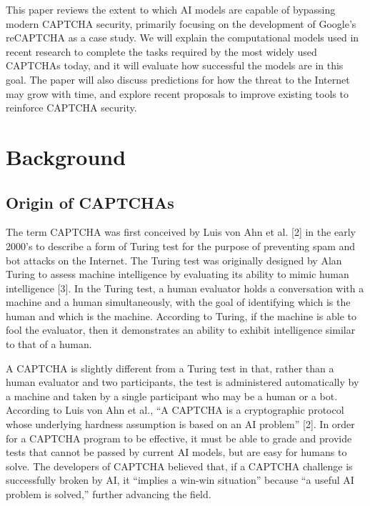 \documentclass[sigplan,screen,nonacm]{acmart-tagged}
\begin{document}
This paper reviews the extent to which AI models are capable of bypassing modern CAPTCHA security, primarily focusing on the development of Google's reCAPTCHA as a case study. We will explain the computational models used in recent research to complete the tasks required by the most widely used CAPTCHAs today, and it will evaluate how successful the models are in this goal. The paper will also discuss predictions for how the threat to the Internet may grow with time, and explore recent proposals to improve existing tools to reinforce CAPTCHA security.
 

\section{Background}
\label{background}

\subsection{Origin of CAPTCHAs}
\label{sec:background-captcha}

The term CAPTCHA was first conceived by Luis von Ahn et al. [2] in the early 2000's to describe a form of Turing test for the purpose of preventing spam and bot attacks on the Internet. The Turing test was originally designed by Alan Turing to assess machine intelligence by evaluating its ability to mimic human intelligence [3]. In the Turing test, a human evaluator holds a conversation with a machine and a human simultaneously, with the goal of identifying which is the human and which is the machine. According to Turing, if the machine is able to fool the evaluator, then it demonstrates an ability to exhibit intelligence similar to that of a human.

A CAPTCHA is slightly different from a Turing test in that, rather than a human evaluator and two participants, the test is administered automatically by a machine and taken by a single participant who may be a human or a bot. According to Luis von Ahn et al., ``A CAPTCHA is a cryptographic protocol whose underlying hardness assumption is based on an AI problem'' [2]. In order for a CAPTCHA program to be effective, it must be able to grade and provide tests that cannot be passed by current AI models, but are easy for humans to solve. The developers of CAPTCHA believed that, if a CAPTCHA challenge is successfully broken by AI, it ``implies a win-win situation'' because ``a useful AI problem is solved,'' further advancing the field.
\end{document}
